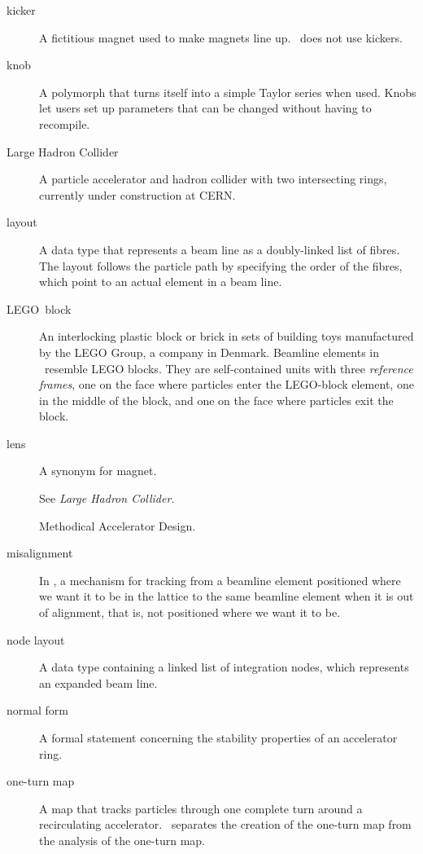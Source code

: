 \begin{description}
  \item[kicker]
A fictitious magnet used to make magnets line up. \PTC\ does not use
kickers.

   \item[knob]
A polymorph that turns itself into a simple Taylor series when used. Knobs
let users set up parameters that can be changed without having to recompile.

  \item[Large Hadron Collider]
A particle accelerator and hadron collider with two intersecting rings,
currently under construction at CERN.

  \item[layout]
A data type that represents a beam line as a doubly-linked list of
fibres. The layout follows the particle path by specifying the order
of the fibres, which point to an actual element in a beam line.

  \item[LEGO\ block]
An interlocking plastic block or brick in sets of building toys manufactured
by the LEGO Group, a company in Denmark.  Beamline elements in \PTC\
resemble LEGO blocks. They are self-contained units with three \emph{reference
frames}, one on the face where  particles enter the LEGO-block element, one
in the middle of the block, and one on the face where particles exit the block.

  \item[lens]
A synonym for magnet.

  \item[{}]
See \emph{Large Hadron Collider.}

  \item[{}]
Methodical Accelerator Design.

  \item[misalignment]
In \PTC, a mechanism for tracking from a beamline element positioned
where we want it to be in the lattice to the same beamline element
when it is out of alignment, that is, not positioned where we want
it to be.

  \item[node layout]
A data type containing a linked list of integration nodes, which
represents an expanded beam line.

  \item[normal form]
A formal statement concerning the stability properties of an accelerator ring.

  \item[one-turn map]
A map that tracks particles through one complete turn around a recirculating
accelerator. \PTC\ separates the creation of the one-turn map from the
analysis of the one-turn map.


\end{description}
